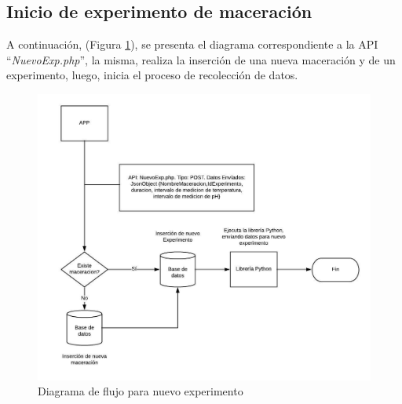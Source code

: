         \subsection{Inicio de experimento de maceración}
        \par A continuación, (Figura \ref{fig:ApiNuevoExp}), se presenta el diagrama correspondiente a la API ``\textit{NuevoExp.php}'', la misma, realiza la inserción de una nueva maceración y de un experimento, luego, inicia el proceso de recolección de datos.
            \begin{figure} [h]
                \centering
                \includegraphics[scale=0.85]{DiagramaNuevoExp.jpeg}
                \caption{Diagrama de flujo para nuevo experimento}
                \label{fig:ApiNuevoExp}
            \end{figure}
            
